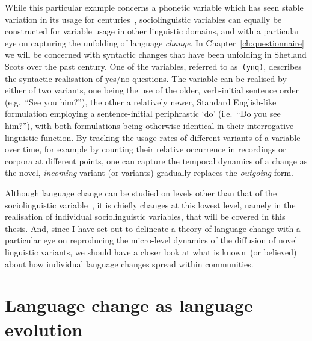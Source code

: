 While this particular example concerns a phonetic variable which has seen stable variation in its usage for centuries~\citep{Labov1989}, sociolinguistic variables can equally be constructed for variable usage in other linguistic domains, and with a particular eye on capturing the unfolding of language \emph{change}. In Chapter~\ref{ch:questionnaire} we will be concerned with syntactic changes that have been unfolding in Shetland Scots over the past century. One of the variables, referred to as~\texttt{(ynq)}, describes the syntactic realisation of yes/no questions. The variable can be realised by either of two variants, one being the use of the older, verb-initial sentence order (e.g.~``See you him?''), the other a relatively newer, Standard English-like formulation employing a sentence-initial periphrastic `do' (i.e.~``Do you see him?''), with both formulations being otherwise identical in their interrogative linguistic function. By tracking the usage rates of different variants of a variable over time, for example by counting their relative occurrence in recordings or corpora at different points, one can capture the temporal dynamics of a change as the novel, \emph{incoming} variant (or variants) gradually replaces the \emph{outgoing} form.


Although language change can be studied on levels other than that of the sociolinguistic variable~\citep[see in particular][p.98]{Croft2006}, it is chiefly changes at this lowest level, namely in the realisation of individual sociolinguistic variables, that will be covered in this thesis. And, since I have set out to delineate a theory of language change with a particular eye on reproducing the micro-level dynamics of the diffusion of novel linguistic variants, we should have a closer look at what is known~(or believed) about how individual language changes spread within communities.



\section{Language change as language evolution}\label{sec:evolutionaryapproaches}

